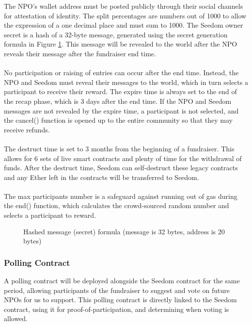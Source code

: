 \documentclass[11pt]{article}
\begin{document}
The NPO's wallet address must be posted publicly through their social channels for attestation of identity. The split percentages are numbers out of 1000 to allow the expression of a one decimal place and must sum to 1000. The Seedom owner secret is a hash of a 32-byte message, generated using the secret generation formula in Figure \ref{figure:secretGenerationFormula}. This message will be revealed to the world after the NPO reveals their message after the fundraiser end time.\\\\
No participation or raising of entries can occur after the end time. Instead, the NPO and Seedom must reveal their messages to the world, which in turn selects a participant to receive their reward. The expire time is always set to the end of the recap phase, which is 3 days after the end time. If the NPO and Seedom messages are not revealed by the expire time, a participant is not selected, and the cancel() function is opened up to the entire community so that they may receive refunds.\\\\
The destruct time is set to 3 months from the beginning of a fundraiser. This allows for 6 sets of live smart contracts and plenty of time for the withdrawal of funds. After the destruct time, Seedom can self-destruct these legacy contracts and any Ether left in the contracts will be transferred to Seedom.\\\\
The max participants number is a safeguard against running out of gas during the end() function, which calculates the crowd-sourced random number and selects a participant to reward.

\begin{figure}[H]
\begin{center}
\caption{Hashed message (secret) formula (message is 32 bytes, address is 20 bytes)}
\label{figure:secretGenerationFormula}
\end{center}
\end{figure}

\subsubsection{Polling Contract}

A polling contract will be deployed alongside the Seedom contract for the same period, allowing participants of the fundraiser to suggest and vote on future NPOs for us to support. This polling contract is directly linked to the Seedom contract, using it for proof-of-participation, and determining when voting is allowed.
\end{document}
